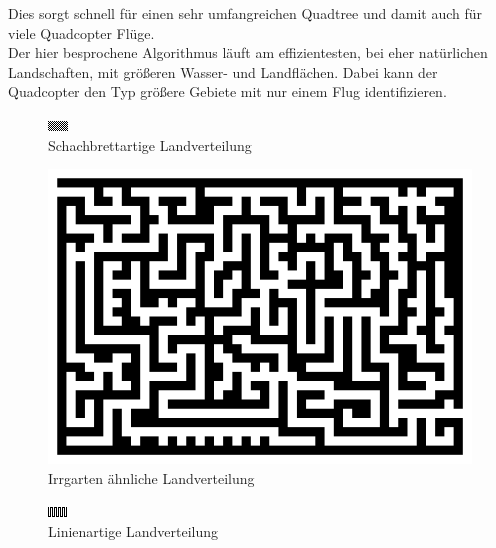 \documentclass[a4paper,12pt]{article}
\begin{document}
Dies sorgt schnell für einen sehr umfangreichen Quadtree und damit auch für viele Quadcopter Flüge.
\\[0.4cm]
Der hier besprochene Algorithmus läuft am effizientesten, bei eher natürlichen Landschaften, mit größeren Wasser- und Landflächen. Dabei kann der Quadcopter den Typ größere Gebiete mit nur einem Flug identifizieren.

\begin{figure}[H]
\centering
    \includegraphics[width=0.7\linewidth]{Bilder/Aufgabe3/Teilaufgabe_D/schachbrett.png}
    \caption{Schachbrettartige Landverteilung}
\end{figure}
\begin{figure}[H]
\centering
    \includegraphics[width=0.7\linewidth]{Bilder/Aufgabe3/Teilaufgabe_D/irrgarten.png}
    \caption{Irrgarten ähnliche Landverteilung}
\end{figure}
\begin{figure}[H]
\centering
    \includegraphics[width=0.7\linewidth]{Bilder/Aufgabe3/Teilaufgabe_D/linien.png}
    \caption{Linienartige Landverteilung}
\end{figure}
\end{document}
